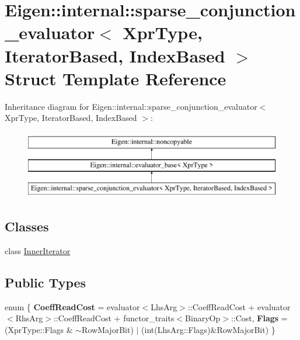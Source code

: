 \hypertarget{struct_eigen_1_1internal_1_1sparse__conjunction__evaluator_3_01_xpr_type_00_01_iterator_based_00_01_index_based_01_4}{}\section{Eigen\+::internal\+::sparse\+\_\+conjunction\+\_\+evaluator$<$ Xpr\+Type, Iterator\+Based, Index\+Based $>$ Struct Template Reference}
\label{struct_eigen_1_1internal_1_1sparse__conjunction__evaluator_3_01_xpr_type_00_01_iterator_based_00_01_index_based_01_4}
Inheritance diagram for Eigen\+::internal\+::sparse\+\_\+conjunction\+\_\+evaluator$<$ Xpr\+Type, Iterator\+Based, Index\+Based $>$\+:\begin{figure}[H]
\begin{center}
\leavevmode
\includegraphics[height=3.000000cm]{struct_eigen_1_1internal_1_1sparse__conjunction__evaluator_3_01_xpr_type_00_01_iterator_based_00_01_index_based_01_4}
\end{center}
\end{figure}
\subsection*{Classes}
\begin{DoxyCompactItemize}
\item 
class \mbox{\hyperlink{class_eigen_1_1internal_1_1sparse__conjunction__evaluator_3_01_xpr_type_00_01_iterator_based_00_a6ef5c4f649d544c873e35b2b7e6dc62}{Inner\+Iterator}}
\end{DoxyCompactItemize}
\subsection*{Public Types}
\begin{DoxyCompactItemize}
\item 
\mbox{\label{struct_eigen_1_1internal_1_1sparse__conjunction__evaluator_3_01_xpr_type_00_01_iterator_based_00_01_index_based_01_4_a816b5644dc8dc5a5a214ace07da5c8f6}} 
enum \{ {\bfseries Coeff\+Read\+Cost} = evaluator$<$Lhs\+Arg$>$\+::Coeff\+Read\+Cost + evaluator$<$Rhs\+Arg$>$\+::Coeff\+Read\+Cost + functor\+\_\+traits$<$Binary\+Op$>$\+::Cost, 
{\bfseries Flags} = (Xpr\+Type\+::Flags \& $\sim$\+Row\+Major\+Bit) $\vert$ (int(Lhs\+Arg\+::Flags)\&Row\+Major\+Bit)
 \}
\end{DoxyCompactItemize}
